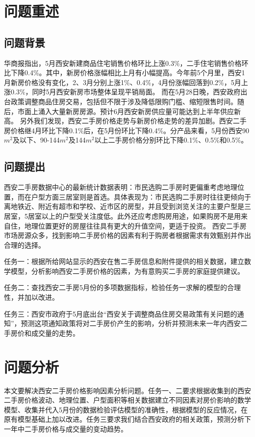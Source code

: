 \documentclass[withoutpreface,bwprint]{cumcmthesis} %
\begin{document}
\section{问题重述}
\subsection{问题背景}
华商报指出，5月西安新建商品住宅销售价格环比上涨0.3\%，二手住宅销售价格环比下降0.4\%。其中，新房价格涨幅相比上月有小幅提高。今年前5个月里，西安1月新房价格没有变化，2、3月分别上涨1\%、0.4\%，4月份涨幅回落到0.2\%，5月上涨0.3\%，同时5月西安新房市场整体呈现平销局面。
而在5月28日晚，西安政府出台政策调整商品住房交易，包括但不限于涉及降低限购门槛、缩短限售时间。随后，市面上涌入大量新房房源。预计6月西安新房供应量可能达到上半年供应新高。
另外我们发现，西安二手房价格走势与新房价格走势的差异加剧。西安二手房价格继4月环比下降0.1\%后，在5月份环比下降0.4\%。分产品来看，5月份西安90$m^2$及以下、90-144$m^2$及144$m^2$以上二手房价格分别环比下降0.1\%、0.5\%和0.5\%。
\subsection{问题提出}
西安二手房数据中心的最新统计数据表明：市民选购二手房时更偏重考虑地理位置，而在户型方面三居室则是首选。具体表现为：市民选购二手房时往往更倾向于离地铁近、附近有超市和学校、近市区的房型，并且受到浏览关注的主要户型是三居室，5居室以上的户型受关注度低。此外还应考虑购房用途，如果购房不是用来自住，地理位置更好的房屋往往具有更大的升值空间，更适于投资。
西安二手房市场房源众多，找到影响二手房价格的因素有利于购房者根据需求有效甄别并作出合理的选择。

任务一：根据所给网站显示的西安在售二手房信息和附件提供的相关数据，建立数学模型，分析影响西安二手房价格的因素，为有意购买二手房的家庭提供建议。

任务二：查找西安二手房5月份的多项数据指标，检验任务一求解的模型的合理性，并加以改进。 

任务三：西安市政府于5月底出台“西安关于调整商品住房交易政策有关问题的通知”，预测这项通知政策将对二手房价产生的影响，分析并预测未来一年内西安二手房价和成交量的走势。
\section{问题分析}
本文要解决西安二手房价格影响因素分析问题。任务一、二要求根据收集到的西安二手房价格波动、地理位置、户型面积等相关数据建立不同因素对房价影响的数学模型、收集并代入5月份的数据检验评估模型的准确性，根据模型的反应情况，在原有模型基础上加以改进。任务三要求我们结合西安政府的相关政策，预测分析下一年中二手房价格与成交量的变动趋势。
\end{document}
